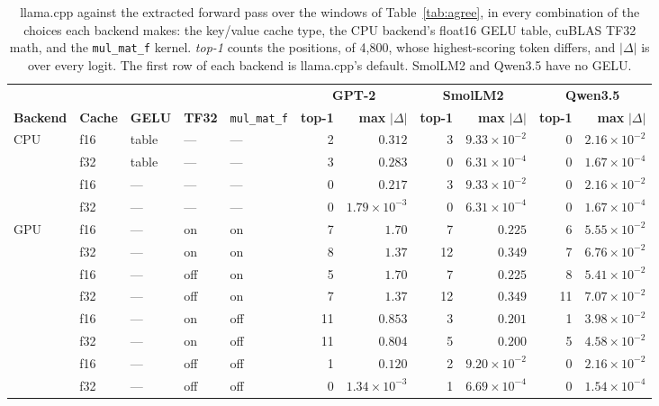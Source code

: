 \documentclass[11pt]{article}
\theoremstyle{plain}
\theoremstyle{definition}
\newcommand{\code}[1]{\texttt{#1}}
\begin{document}
\begin{table}[t]
\centering
\footnotesize
\setlength{\tabcolsep}{2.5pt}
\begin{tabular}{lllllrrrrrr}
\toprule
 & & & & & \multicolumn{2}{c}{\textbf{GPT-2}} & \multicolumn{2}{c}{\textbf{SmolLM2}} & \multicolumn{2}{c}{\textbf{Qwen3.5}} \\
\cmidrule(lr){6-7} \cmidrule(lr){8-9} \cmidrule(lr){10-11}
\textbf{Backend} & \textbf{Cache} & \textbf{GELU} & \textbf{TF32} & \code{mul\_mat\_f} & \textbf{top-1} & \textbf{max} $|\Delta|$ & \textbf{top-1} & \textbf{max} $|\Delta|$ & \textbf{top-1} & \textbf{max} $|\Delta|$ \\
\midrule
CPU & f16 & table & --- & --- & 2  & $0.312$             & 3  & $9.33\times10^{-2}$ & 0  & $2.16\times10^{-2}$ \\
    & f32 & table & --- & --- & 3  & $0.283$             & 0  & $6.31\times10^{-4}$ & 0  & $1.67\times10^{-4}$ \\
    & f16 & ---   & --- & --- & 0  & $0.217$             & 3  & $9.33\times10^{-2}$ & 0  & $2.16\times10^{-2}$ \\
    & f32 & ---   & --- & --- & 0  & $1.79\times10^{-3}$ & 0  & $6.31\times10^{-4}$ & 0  & $1.67\times10^{-4}$ \\
\midrule
GPU & f16 & ---   & on  & on  & 7  & $1.70$              & 7  & $0.225$             & 6  & $5.55\times10^{-2}$ \\
    & f32 & ---   & on  & on  & 8  & $1.37$              & 12 & $0.349$             & 7  & $6.76\times10^{-2}$ \\
    & f16 & ---   & off & on  & 5  & $1.70$              & 7  & $0.225$             & 8  & $5.41\times10^{-2}$ \\
    & f32 & ---   & off & on  & 7  & $1.37$              & 12 & $0.349$             & 11 & $7.07\times10^{-2}$ \\
    & f16 & ---   & on  & off & 11 & $0.853$             & 3  & $0.201$             & 1  & $3.98\times10^{-2}$ \\
    & f32 & ---   & on  & off & 11 & $0.804$             & 5  & $0.200$             & 5  & $4.58\times10^{-2}$ \\
    & f16 & ---   & off & off & 1  & $0.120$             & 2  & $9.20\times10^{-2}$ & 0  & $2.16\times10^{-2}$ \\
    & f32 & ---   & off & off & 0  & $1.34\times10^{-3}$ & 1  & $6.69\times10^{-4}$ & 0  & $1.54\times10^{-4}$ \\
\bottomrule
\end{tabular}
\caption{llama.cpp against the extracted forward pass over the windows of
Table~\ref{tab:agree}, in every combination of the choices each backend makes:
the key/value cache type, the CPU backend's float16 GELU table, cuBLAS TF32
math, and the \code{mul\_mat\_f} kernel. \emph{top-1} counts the positions, of
4{,}800, whose highest-scoring token differs, and $|\Delta|$ is over every
logit. The first row of each backend is llama.cpp's default. SmolLM2 and
Qwen3.5 have no GELU.}
\label{tab:llamacpp}
\end{table}
\end{document}
